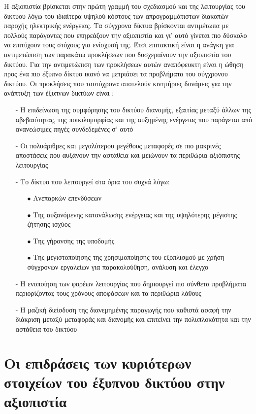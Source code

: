 \documentclass[12pt, a4paper, oneside]{report}
\begin{document}
Η αξιοπιστία βρίσκεται στην πρώτη γραμμή του σχεδιασμού και της λειτουργίας του δικτύου λόγω του ιδιαίτερα υψηλού κόστους των απρογραμμάτιστων διακοπών παροχής ηλεκτρικής ενέργειας. Τα σύγχρονα δίκτυα βρίσκονται αντιμέτωπα με πολλούς παράγοντες που επηρεάζουν την αξιοπιστία και γι’ αυτό γίνεται πιο δύσκολο να επιτύχουν τους στόχους για ενίσχυσή της. Έτσι επιτακτική είναι η ανάγκη για αντιμετώπιση των παρακάτω προκλήσεων που δυσχεραίνουν την αξιοπιστία του δικτύου. Για την αντιμετώπιση των προκλήσεων αυτών αναπόφευκτη είναι η ώθηση προς ένα πιο έξυπνο δίκτυο ικανό να μετριάσει τα προβλήματα του σύγχρονου δικτύου. Οι προκλήσεις που ταυτόχρονα αποτελούν κινητήριες δυνάμεις για την ανάπτυξη των έξυπνων δικτύων είναι \cite{39}:
\begin{itemize}
\item[-] Η επιδείνωση της συμφόρησης του δικτύου διανομής, εξαιτίας μεταξύ άλλων της αβεβαιότητας, της ποικιλομορφίας και της αυξημένης ενέργειας που παράγεται από ανανεώσιμες πηγές συνδεδεμένες σ’ αυτό
\item[-] Οι πολυάριθμες και μεγαλύτερου μεγέθους μεταφορές σε πιο μακρινές αποστάσεις που αυξάνουν την αστάθεια και μειώνουν τα περιθώρια αξιόπιστης λειτουργίας
\item[-]Το δίκτυο που λειτουργεί στα όρια του συχνά λόγω:
\begin{itemize}
\item[$\bullet$] Ανεπαρκών επενδύσεων
\item[$\bullet$] Της αυξανόμενης κατανάλωσης ενέργειας και της υψηλότερης μέγιστης ζήτησης ισχύος
\item[$\bullet$] Της γήρανσης της υποδομής
\item[$\bullet$] Της μεγιστοποίησης της χρησιμοποίησης του εξοπλισμού με χρήση σύγχρονων εργαλείων για παρακολούθηση, ανάλυση και έλεγχο
\end{itemize}
\item[-] Η ενοποίηση των φορέων λειτουργίας που δημιουργεί πιο σύνθετα προβλήματα περιορίζοντας τους χρόνους αποφάσεων και τα περιθώρια λάθους
\item[-] Η μαζική διείσδυση της διανεμημένης παραγωγής που καθιστά ασαφή την διάκριση μεταξύ μεταφοράς και διανομής και επιτείνει την πολυπλοκότητα και την αστάθεια του δικτύου
\end{itemize}

\section{Οι επιδράσεις των κυριότερων στοιχείων του έξυπνου δικτύου στην αξιοπιστία}
\end{document}
